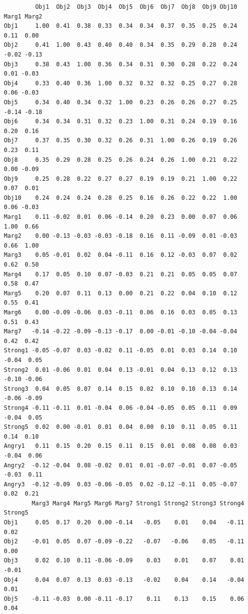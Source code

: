 \documentclass[
  english,
]{book}
\begin{document}
\begin{verbatim}
         Obj1  Obj2  Obj3  Obj4  Obj5  Obj6  Obj7  Obj8  Obj9 Obj10 Marg1 Marg2
Obj1     1.00  0.41  0.38  0.33  0.34  0.34  0.37  0.35  0.25  0.24  0.11  0.00
Obj2     0.41  1.00  0.43  0.40  0.40  0.34  0.35  0.29  0.28  0.24 -0.02 -0.13
Obj3     0.38  0.43  1.00  0.36  0.34  0.31  0.30  0.28  0.22  0.24  0.01 -0.03
Obj4     0.33  0.40  0.36  1.00  0.32  0.32  0.32  0.25  0.27  0.28  0.06 -0.03
Obj5     0.34  0.40  0.34  0.32  1.00  0.23  0.26  0.26  0.27  0.25 -0.14 -0.18
Obj6     0.34  0.34  0.31  0.32  0.23  1.00  0.31  0.24  0.19  0.16  0.20  0.16
Obj7     0.37  0.35  0.30  0.32  0.26  0.31  1.00  0.26  0.19  0.26  0.23  0.11
Obj8     0.35  0.29  0.28  0.25  0.26  0.24  0.26  1.00  0.21  0.22  0.00 -0.09
Obj9     0.25  0.28  0.22  0.27  0.27  0.19  0.19  0.21  1.00  0.22  0.07  0.01
Obj10    0.24  0.24  0.24  0.28  0.25  0.16  0.26  0.22  0.22  1.00  0.06 -0.03
Marg1    0.11 -0.02  0.01  0.06 -0.14  0.20  0.23  0.00  0.07  0.06  1.00  0.66
Marg2    0.00 -0.13 -0.03 -0.03 -0.18  0.16  0.11 -0.09  0.01 -0.03  0.66  1.00
Marg3    0.05 -0.01  0.02  0.04 -0.11  0.16  0.12 -0.03  0.07  0.02  0.62  0.50
Marg4    0.17  0.05  0.10  0.07 -0.03  0.21  0.21  0.05  0.05  0.07  0.58  0.47
Marg5    0.20  0.07  0.11  0.13  0.00  0.21  0.22  0.04  0.10  0.12  0.55  0.41
Marg6    0.00 -0.09 -0.06  0.03 -0.11  0.06  0.16  0.03  0.05  0.13  0.51  0.43
Marg7   -0.14 -0.22 -0.09 -0.13 -0.17  0.00 -0.01 -0.10 -0.04 -0.04  0.42  0.42
Strong1 -0.05 -0.07  0.03 -0.02  0.11 -0.05  0.01  0.03  0.14  0.10 -0.04  0.05
Strong2  0.01 -0.06  0.01  0.04  0.13 -0.01  0.04  0.13  0.12  0.13 -0.10 -0.06
Strong3  0.04  0.05  0.07  0.14  0.15  0.02  0.10  0.10  0.13  0.14 -0.06 -0.09
Strong4 -0.11 -0.11  0.01 -0.04  0.06 -0.04 -0.05  0.05  0.11  0.09 -0.04  0.05
Strong5  0.02  0.00 -0.01  0.01  0.04  0.00  0.10  0.11  0.05  0.11  0.14  0.10
Angry1   0.11  0.15  0.20  0.15  0.11  0.15  0.01  0.08  0.08  0.03 -0.04  0.06
Angry2  -0.12 -0.04  0.08 -0.02  0.01  0.01 -0.07 -0.01  0.07 -0.05 -0.03  0.11
Angry3  -0.12 -0.09  0.03 -0.06 -0.05  0.02 -0.12 -0.11  0.05 -0.07  0.02  0.21
        Marg3 Marg4 Marg5 Marg6 Marg7 Strong1 Strong2 Strong3 Strong4 Strong5
Obj1     0.05  0.17  0.20  0.00 -0.14   -0.05    0.01    0.04   -0.11    0.02
Obj2    -0.01  0.05  0.07 -0.09 -0.22   -0.07   -0.06    0.05   -0.11    0.00
Obj3     0.02  0.10  0.11 -0.06 -0.09    0.03    0.01    0.07    0.01   -0.01
Obj4     0.04  0.07  0.13  0.03 -0.13   -0.02    0.04    0.14   -0.04    0.01
Obj5    -0.11 -0.03  0.00 -0.11 -0.17    0.11    0.13    0.15    0.06    0.04

\end{verbatim}
\end{document}
